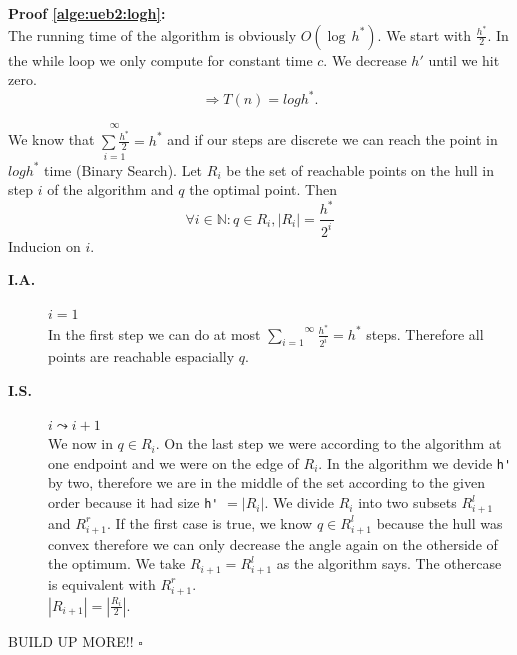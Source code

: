 \documentclass[11pt,a4paper,ngerman]{article}
\begin{document}
\begin{description}
\textbf{Proof \ref{alge:ueb2:logh}:}\\
The running time of the algorithm is obviously $O(\log \, h^*)$.
We start with $\frac{h^*}{2}$. In the while loop we only
compute for constant time $c$. We decrease $h'$ until we hit zero.
$$
\Rightarrow T(n) = log h^*.
$$

We know that $\overset{\infty}{\underset{i=1}{\sum \frac{h^*}{2}}} = h^*$
and if our steps are discrete we can reach the point in $log h^*$ time
(Binary Search).
Let $R_i$ be the set of reachable points on the hull in step $i$
of the algorithm and $q$ the optimal point. Then
$$
    \forall i \in \mathbb{N} : q \in R_i, |R_i| = \frac{h^*}{2^i}
$$
Inducion on $i$.
\begin{description}
    \item[\bfseries I.A.] $i=1$\\
    In the first step we can do at most 
    $\overset{\infty}{\underset{i=1}{\sum}} \frac{h^*}{2^i} = h^*$
    steps. Therefore all points are reachable espacially $q$.
    \item[\bfseries I.S.] $i \leadsto i+1$\\
    We now in $q \in R_i$. On the last step we were
    according to the algorithm at one endpoint and we were on the
    edge of $R_i$. In the algorithm we devide \lstinline|h'| by two,
    therefore we are in the middle of the set according to the given order
    because it had size \lstinline|h'| $= |R_i|$.
    We divide $R_i$ into two subsets $R_{i+1}^l$ and $R_{i+1}^r$.
    If the first case is true, we know $q \in R_{i+1}^l$ because
    the hull was convex therefore we can only decrease the angle again
    on the otherside of the optimum. We take $R_{i+1}=R_{i+1}^l$
    as the algorithm says. The othercase is equivalent with $R_{i+1}^r$.\\
    $|R_{i+1}| = |\frac{R_i}{2}|$.
\end{description}
BUILD UP MORE!!
\mbox{}\hfill$\square$




\end{description}
\end{document}
